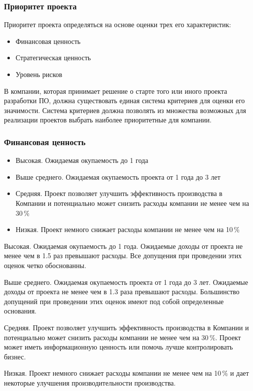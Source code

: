 \documentclass{../industrial-development}
\begin{document}
    \begin{frame} \frametitle{Приоритет проекта}
	Приоритет проекта определяться на основе оценки трех его характеристик:
	
	\begin{itemize}
		\item Финансовая ценность
		\item Стратегическая ценность
		\item Уровень рисков
	\end{itemize}
    \end{frame}
    \lecturenotes
    В компании, которая принимает решение о старте того или иного проекта разработки ПО, должна существовать единая система критериев для оценки его значимости. Система критериев должна позволять из множества возможных для реализации проектов выбрать наиболее приоритетные для компании.

    \begin{frame} \frametitle{Финансовая ценность}
	\begin{itemize}
		\item Высокая. Ожидаемая окупаемость до 1 года
		\item Выше среднего. Ожидаемая окупаемость проекта от 1 года до 3 лет
		\item Средняя. Проект позволяет улучшить эффективность производства в Компании и потенциально может снизить расходы компании не менее чем на 30\,\%
		\item Низкая. Проект немного снижает расходы компании не менее чем на 10\,\%
	\end{itemize}
    \end{frame}
    \lecturenotes

Высокая. Ожидаемая окупаемость до 1 года. Ожидаемые доходы от проекта не менее чем в 1.5 раз превышают расходы. Все допущения при проведении этих оценок четко обоснованны.

Выше среднего. Ожидаемая окупаемость проекта от 1 года до 3 лет. Ожидаемые доходы от проекта не менее чем в 1.3 раза превышают расходы. Большинство допущений при проведении этих оценок имеют под собой определенные основания.

Средняя. Проект позволяет улучшить эффективность производства в Компании и потенциально может снизить расходы компании не менее чем на 30\,\%. Проект может иметь информационную ценность или помочь лучше контролировать бизнес.

Низкая. Проект немного снижает расходы компании не менее чем на 10\,\% и дает некоторые улучшения производительности производства.
\end{document}
